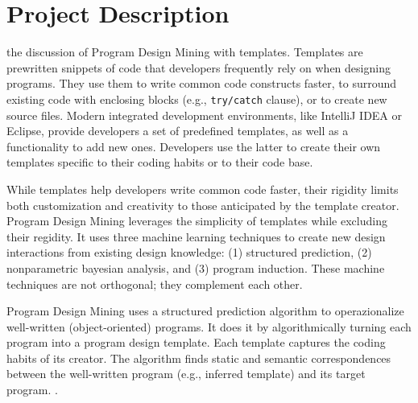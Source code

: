 \chapter{Project Description}{}
\label{sec:related}

 the discussion of Program Design Mining with templates. 
Templates are prewritten snippets of code that developers frequently rely on when 
designing programs. They use them to write common code constructs faster, to 
surround existing code with enclosing blocks (e.g., \texttt{try/catch} clause), or to 
create new source files. Modern integrated development environments, like IntelliJ IDEA 
or Eclipse, provide developers a set of predefined templates, as well as a functionality 
to add new ones. Developers use the latter to create their own templates specific to 
their coding habits or to their code base. 

While templates help developers write common code faster, their rigidity limits both 
customization and creativity to those anticipated by the template creator. Program 
Design Mining leverages the simplicity of templates while excluding their regidity. It 
uses three machine learning techniques to create new design interactions from existing 
design knowledge: (1) structured prediction, (2) nonparametric bayesian analysis, and 
(3) program induction. These machine techniques are not orthogonal; they complement 
each other. 

Program Design Mining uses a structured prediction algorithm to operazionalize 
well-written (object-oriented) programs. It does it by algorithmically turning each 
program into a program design template. Each template captures the coding habits of 
its creator. The algorithm finds static and semantic correspondences between the 
well-written program (e.g., inferred template) and its target program. .


%
%
%
%
%
%

